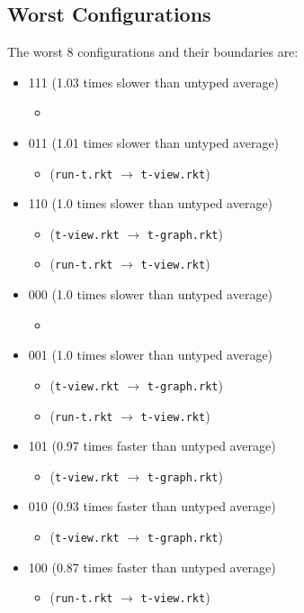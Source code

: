 \documentclass{article}
\newcommand{\mono}[1]{\texttt{#1}}
\begin{document}
\subsection{Worst Configurations}
The worst 8 configurations and their boundaries are:
\begin{itemize}
\item 111 (1.03 times slower than untyped average)
  \begin{itemize}
  \item 
  \end{itemize}
\item 011 (1.01 times slower than untyped average)
  \begin{itemize}
  \item (\mono{run-t.rkt} $\rightarrow$ \mono{t-view.rkt})
  \end{itemize}
\item 110 (1.0 times slower than untyped average)
  \begin{itemize}
  \item (\mono{t-view.rkt} $\rightarrow$ \mono{t-graph.rkt})
  \item (\mono{run-t.rkt} $\rightarrow$ \mono{t-view.rkt})
  \end{itemize}
\item 000 (1.0 times slower than untyped average)
  \begin{itemize}
  \item 
  \end{itemize}
\item 001 (1.0 times slower than untyped average)
  \begin{itemize}
  \item (\mono{t-view.rkt} $\rightarrow$ \mono{t-graph.rkt})
  \item (\mono{run-t.rkt} $\rightarrow$ \mono{t-view.rkt})
  \end{itemize}
\item 101 (0.97 times faster than untyped average)
  \begin{itemize}
  \item (\mono{t-view.rkt} $\rightarrow$ \mono{t-graph.rkt})
  \end{itemize}
\item 010 (0.93 times faster than untyped average)
  \begin{itemize}
  \item (\mono{t-view.rkt} $\rightarrow$ \mono{t-graph.rkt})
  \end{itemize}
\item 100 (0.87 times faster than untyped average)
  \begin{itemize}
  \item (\mono{run-t.rkt} $\rightarrow$ \mono{t-view.rkt})
  \end{itemize}


\end{itemize}
\end{document}
